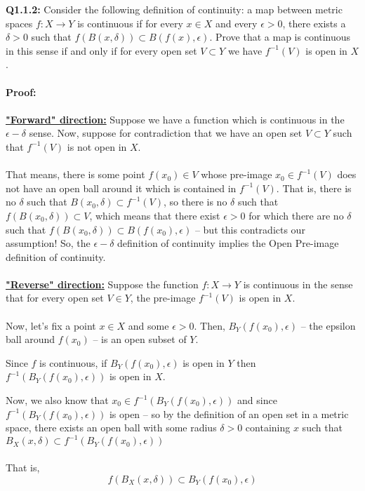 \documentclass[twoside]{article}
\begin{document}
\textbf{Q1.1.2:} Consider the following definition of continuity: a map between metric spaces $f : X \rightarrow Y$ is continuous if for every $x \in X$ and every $\epsilon > 0$, there exists a $\delta > 0$ such that $f(B(x, \delta)) \subset B(f(x), \epsilon)$. Prove that a map is continuous in this sense if and only if for every open set $V \subset Y$ we have $f^{-1}(V)$ is open in $X$.
\\
\\
\textbf{Proof:}
\\
\\
\underline{\textbf{"Forward" direction:}} Suppose we have a function which is continuous in the $\epsilon-\delta$ sense. Now, suppose for contradiction that we have an open set $V \subset Y$ such that $f^{-1}(V)$ is not open in $X$. 
\\
\\
That means, there is some point $f(x_0) \in V$ whose pre-image $x_0 \in f^{-1}(V)$ does not have an open ball around it which is contained in $f^{-1}(V)$. That is, there is no $\delta$ such that $B(x_0, \delta) \subset f^{-1}(V)$, so there is no $\delta$ such that $f(B(x_0,\delta)) \subset V$, which means that there exist $\epsilon > 0$ for which there are no $\delta$ such that $f(B(x_0, \delta)) \subset B(f(x_0), \epsilon)$ -- but this contradicts our assumption! So, the $\epsilon-\delta$ definition of continuity implies the Open Pre-image definition of continuity.
\\
\\
\underline{\textbf{"Reverse" direction:}} Suppose the function $f : X \rightarrow Y$ is continuous in the sense that for every open set $V \in Y$, the pre-image $f^{-1}(V)$ is open in $X$. 
\\
\\
Now, let's fix a point $x \in X$ and some $\epsilon > 0$. Then, $B_Y (f(x_0), \epsilon)$ -- the epsilon ball around $f(x_0)$ -- is an open subset of $Y$.

Since $f$ is continuous, if $B_Y (f(x_0), \epsilon)$ is open in $Y$ then $f^{-1}(B_Y (f(x_0), \epsilon))$ is open in $X$. 

Now, we also know that $x_0 \in f^{-1}(B_Y (f(x_0), \epsilon))$ and since $f^{-1}(B_Y (f(x_0), \epsilon))$ is open -- so by the definition of an open set in a metric space, there exists an open ball with some  radius $\delta > 0$ containing $x$ such that $B_X(x, \delta) \subset f^{-1}(B_Y (f(x_0), \epsilon))$
\\
\\
That is, 
\[ \boxed{f(B_X(x, \delta)) \subset B_Y (f(x_0), \epsilon)} \]
\end{document}

